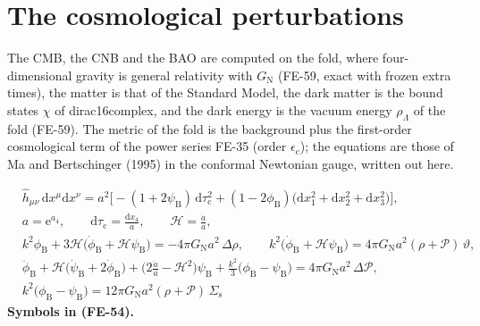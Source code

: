 \documentclass[
  10pt,
]{article}
\begin{document}
\hypertarget{the-cosmological-perturbations}{%
\section{The cosmological
perturbations}\label{the-cosmological-perturbations}}

The CMB, the CNB and the BAO are computed on the fold, where
four-dimensional gravity is general relativity with \(G_{\mathrm{N}}\)
(FE-59, exact with frozen extra times), the matter is that of the
Standard Model, the dark matter is the bound states \(\chi\) of
dirac16complex, and the dark energy is the vacuum energy
\(\rho_\Lambda\) of the fold (FE-59). The metric of the fold is the
background plus the first-order cosmological term of the power series
FE-35 (order \(\epsilon_{\mathrm{c}}\)); the equations are those of Ma
and Bertschinger (1995) in the conformal Newtonian gauge, written out
here.

\[
\begin{aligned}
&\hat h_{\mu\nu}\,\mathrm{d}x^\mu\mathrm{d}x^\nu = a^2\Big[-(1 + 2\psi_{\mathrm{B}})\,\mathrm{d}\tau_{\mathrm{c}}^2
 + (1 - 2\phi_{\mathrm{B}})\big(\mathrm{d}x_1^2 + \mathrm{d}x_2^2 + \mathrm{d}x_3^2\big)\Big],\\
&a = \mathrm{e}^{a_4},\qquad \mathrm{d}\tau_{\mathrm{c}} = \frac{\mathrm{d}x_4}{a},\qquad \mathcal{H} = \frac{\dot a}{a},\\
&k^2\phi_{\mathrm{B}} + 3\mathcal{H}\big(\dot\phi_{\mathrm{B}} + \mathcal{H}\psi_{\mathrm{B}}\big) = -4\pi G_{\mathrm{N}}a^2\,\Delta\rho,\qquad
 k^2\big(\dot\phi_{\mathrm{B}} + \mathcal{H}\psi_{\mathrm{B}}\big) = 4\pi G_{\mathrm{N}}a^2(\rho + \mathcal{P})\,\vartheta,\\
&\ddot\phi_{\mathrm{B}} + \mathcal{H}\big(\dot\psi_{\mathrm{B}} + 2\dot\phi_{\mathrm{B}}\big) + \Big(2\frac{\ddot a}{a} - \mathcal{H}^2\Big)\psi_{\mathrm{B}}
 + \frac{k^2}{3}\big(\phi_{\mathrm{B}} - \psi_{\mathrm{B}}\big) = 4\pi G_{\mathrm{N}}a^2\,\Delta\mathcal{P},\\
&k^2\big(\phi_{\mathrm{B}} - \psi_{\mathrm{B}}\big) = 12\pi G_{\mathrm{N}}a^2(\rho + \mathcal{P})\,\Sigma_{\mathrm{s}}
\end{aligned} \tag{FE-54}
\] \textbf{Symbols in (FE-54).}
\end{document}
